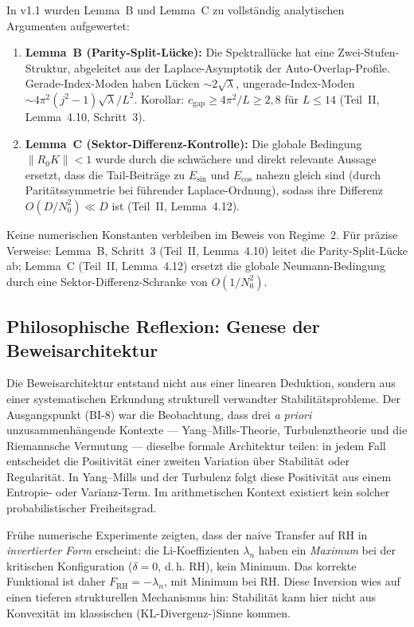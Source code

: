 \documentclass[12pt,a4paper]{article}
\theoremstyle{definition}
\theoremstyle{remark}
\begin{document}
In v1.1 wurden Lemma~B und Lemma~C zu vollständig analytischen Argumenten aufgewertet:
\begin{enumerate}
  \item \textbf{Lemma~B (Parity-Split-Lücke):} Die Spektrallücke hat eine Zwei-Stufen-Struktur, abgeleitet aus der Laplace-Asymptotik der Auto-Overlap-Profile. Gerade-Index-Moden haben Lücken $\sim 2\sqrt{\lambda}$, ungerade-Index-Moden $\sim 4\pi^2(j^2-1)\sqrt{\lambda}/L^2$. Korollar: $c_{\mathrm{gap}} \geq 4\pi^2/L \geq 2{,}8$ für $L \leq 14$ (Teil~II, Lemma~4.10, Schritt~3).
  \item \textbf{Lemma~C (Sektor-Differenz-Kontrolle):} Die globale Bedingung $\|R_0 K\| < 1$ wurde durch die schwächere und direkt relevante Aussage ersetzt, dass die Tail-Beiträge zu $E_{\sin}$ und $E_{\cos}$ nahezu gleich sind (durch Paritätssymmetrie bei führender Laplace-Ordnung), sodass ihre Differenz $O(D/N_0^2) \ll D$ ist (Teil~II, Lemma~4.12).
\end{enumerate}
Keine numerischen Konstanten verbleiben im Beweis von Regime~2. Für präzise Verweise: Lemma~B, Schritt~3 (Teil~II, Lemma~4.10) leitet die Parity-Split-Lücke ab; Lemma~C (Teil~II, Lemma~4.12) ersetzt die globale Neumann-Bedingung durch eine Sektor-Differenz-Schranke von $O(1/N_0^2)$.

\subsection{Philosophische Reflexion: Genese der Beweisarchitektur}

Die Beweisarchitektur entstand nicht aus einer linearen Deduktion, sondern aus einer systematischen Erkundung strukturell verwandter Stabilitätsprobleme. Der Ausgangspunkt (BI-8) war die Beobachtung, dass drei \emph{a priori} unzusammenhängende Kontexte --- Yang--Mills-Theorie, Turbulenztheorie und die Riemannsche Vermutung --- dieselbe formale Architektur teilen: in jedem Fall entscheidet die Positivität einer zweiten Variation über Stabilität oder Regularität. In Yang--Mills und der Turbulenz folgt diese Positivität aus einem Entropie- oder Varianz-Term. Im arithmetischen Kontext existiert kein solcher probabilistischer Freiheitsgrad.

Frühe numerische Experimente zeigten, dass der naive Transfer auf RH in \emph{invertierter Form} erscheint: die Li-Koeffizienten $\lambda_n$ haben ein \emph{Maximum} bei der kritischen Konfiguration ($\delta = 0$, d.\,h. RH), kein Minimum. Das korrekte Funktional ist daher $F_{\mathrm{RH}} = -\lambda_n$, mit Minimum bei RH. Diese Inversion wies auf einen tieferen strukturellen Mechanismus hin: Stabilität kann hier nicht aus Konvexität im klassischen (KL-Divergenz-)Sinne kommen.
\end{document}
